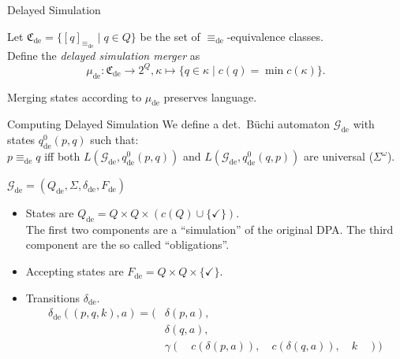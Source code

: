 \begin{frame}{Delayed Simulation}
\begin{defn}
	Let $\mathfrak{C}_\text{de} = \{ [q]_{\equiv_\text{de}} \mid q \in Q \}$ be the set of $\equiv_\text{de}$-equivalence classes. \\
	Define the \emph{delayed simulation merger} as $$\mu_\text{de} : \mathfrak{C}_\text{de} \rightarrow 2^Q, \kappa \mapsto \{ q \in \kappa \mid c(q) = \min c(\kappa) \}.$$
\end{defn}

\begin{theorem}
	Merging states according to $\mu_\text{de}$ preserves language.
\end{theorem}
\end{frame}


\begin{frame}{Computing Delayed Simulation}
We define a det.\ Büchi automaton $\mathcal{G}_\text{de}$ with states $q_\text{de}^0(p, q)$ such that: \\
	$p \equiv_\text{de} q$ iff both $L(\mathcal{G}_\text{de}, q_\text{de}^0(p, q))$ and $L(\mathcal{G}_\text{de}, q_\text{de}^0(q, p))$ are universal ($\Sigma^\omega$).
	
	\pause
	\vspace{.6cm}

$\mathcal{G}_\text{de} = (Q_\text{de}, \Sigma, \delta_\text{de}, F_\text{de})$

\begin{itemize}
	\item States are $Q_\text{de} = Q \times Q \times (c(Q) \cup \{\checkmark\})$. \\
The first two components are a \enquote{simulation} of the original DPA. The third component are the so called \enquote{obligations}.
	\item Accepting states are $F_\text{de} = Q \times Q \times \{\checkmark\}$.
	\item Transitions $\delta_\text{de}$.
\begin{align*}
	\delta_\text{de}((p, q, k), a) = (& \delta(p, a), \\
									& \delta(q, a), \\
									& \gamma( \quad c(\delta(p, a)), \quad c(\delta(q, a)), \quad k \quad ))
\end{align*}
\end{itemize}

\end{frame}


